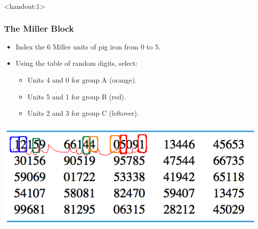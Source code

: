 \documentclass[handout]{beamer}\usepackage{graphicx, color}
\newcommand{\answers}{1}
\numberwithin{equation}{section}
\begin{document}
\begin{frame}<handout:\answers>
\frametitle{The Miller Block}

\begin{itemize}
 \item Index the 6 Miller units of pig iron from 0 to 5.
\pause \item Using the table of random digits, select:
\begin{itemize}
\pause \item Units 4 and 0 for group A (orange).
\pause \item Units 5 and 1 for group B (red).
\pause \item Units 2 and 3 for group C (leftover).
\end{itemize}
\end{itemize}
\begin{center}
 \includegraphics{../../fig/rdigitsshortMiller.png}
\end{center}
\end{frame}


\end{document}
